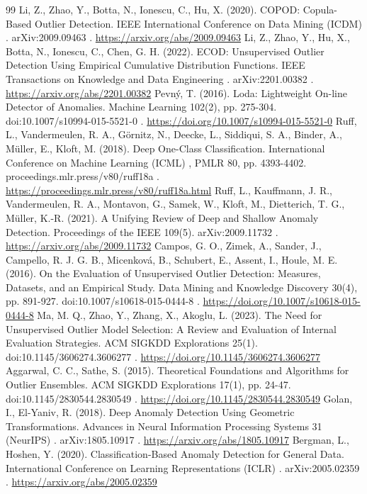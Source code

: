\documentclass[3p,twocolumn]{elsarticle}
\begin{document}
\begin{thebibliography}{99}
\label{r11} Li, Z., Zhao, Y., Botta, N., Ionescu, C., Hu, X. (2020). COPOD: Copula-Based Outlier Detection. IEEE International Conference on Data Mining (ICDM) . arXiv:2009.09463 . \url{https://arxiv.org/abs/2009.09463}
\label{r12} Li, Z., Zhao, Y., Hu, X., Botta, N., Ionescu, C., Chen, G. H. (2022). ECOD: Unsupervised Outlier Detection Using Empirical Cumulative Distribution Functions. IEEE Transactions on Knowledge and Data Engineering . arXiv:2201.00382 . \url{https://arxiv.org/abs/2201.00382}
\label{r13} Pevný, T. (2016). Loda: Lightweight On-line Detector of Anomalies. Machine Learning 102(2), pp. 275-304. doi:10.1007/s10994-015-5521-0 . \url{https://doi.org/10.1007/s10994-015-5521-0}
\label{r14} Ruff, L., Vandermeulen, R. A., Görnitz, N., Deecke, L., Siddiqui, S. A., Binder, A., Müller, E., Kloft, M. (2018). Deep One-Class Classification. International Conference on Machine Learning (ICML) , PMLR 80, pp. 4393-4402. proceedings.mlr.press/v80/ruff18a . \url{https://proceedings.mlr.press/v80/ruff18a.html}
\label{r15} Ruff, L., Kauffmann, J. R., Vandermeulen, R. A., Montavon, G., Samek, W., Kloft, M., Dietterich, T. G., Müller, K.-R. (2021). A Unifying Review of Deep and Shallow Anomaly Detection. Proceedings of the IEEE 109(5). arXiv:2009.11732 . \url{https://arxiv.org/abs/2009.11732}
\label{r16} Campos, G. O., Zimek, A., Sander, J., Campello, R. J. G. B., Micenková, B., Schubert, E., Assent, I., Houle, M. E. (2016). On the Evaluation of Unsupervised Outlier Detection: Measures, Datasets, and an Empirical Study. Data Mining and Knowledge Discovery 30(4), pp. 891-927. doi:10.1007/s10618-015-0444-8 . \url{https://doi.org/10.1007/s10618-015-0444-8}
\label{r17} Ma, M. Q., Zhao, Y., Zhang, X., Akoglu, L. (2023). The Need for Unsupervised Outlier Model Selection: A Review and Evaluation of Internal Evaluation Strategies. ACM SIGKDD Explorations 25(1). doi:10.1145/3606274.3606277 . \url{https://doi.org/10.1145/3606274.3606277}
\label{r18} Aggarwal, C. C., Sathe, S. (2015). Theoretical Foundations and Algorithms for Outlier Ensembles. ACM SIGKDD Explorations 17(1), pp. 24-47. doi:10.1145/2830544.2830549 . \url{https://doi.org/10.1145/2830544.2830549}
\label{r19} Golan, I., El-Yaniv, R. (2018). Deep Anomaly Detection Using Geometric Transformations. Advances in Neural Information Processing Systems 31 (NeurIPS) . arXiv:1805.10917 . \url{https://arxiv.org/abs/1805.10917}
\label{r20} Bergman, L., Hoshen, Y. (2020). Classification-Based Anomaly Detection for General Data. International Conference on Learning Representations (ICLR) . arXiv:2005.02359 . \url{https://arxiv.org/abs/2005.02359}

\end{thebibliography}
\end{document}
